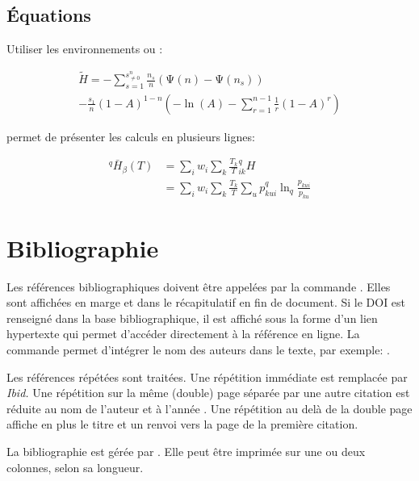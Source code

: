 \documentclass[
  a4paper, %
  11pt, extrafontsizes, %
  onecolumn, %
  openright, %
]{memoir}
\begin{document}
\subsection{\'Equations}

Utiliser les environnements  ou :

\begin{multline}
  \tilde{H}
  = -\sum_{s=1}^{s^{n}_{\ne 0}}
    {\frac{n_s}{n}\left(\mathrm{\Psi}\left(n\right) - \mathrm{\Psi}\left(n_s\right)\right)} \\
    -\frac{s_{1}}{n} {\left(1-A\right)}^{1-n} \left(-{\ln\left(A\right)}-\sum^{n-1}_{r=1}{\frac{1}{r}{\left(1-A\right)}^r}\right)
\label{eq:Chao2013}
\end{multline}

  permet de présenter les calculs en plusieurs lignes:

\begin{align}
  ^{q}\bar{H}_{\beta}\left(T\right)
    &= \sum_i{w_i}\sum_k{\frac{T_k}{T}{^{q}_{ik}H}}\\
    &= \sum_i{w_i}\sum_k{\frac{T_k}{T}\sum_u{p^{q}_{kui}\ln_q\frac{p_{kui}}{p_{ku}}}}
\end{align}



\section{Bibliographie}

Les références bibliographiques doivent être appelées par la commande . 
Elles sont affichées en marge \autocite{Rao1985} et dans le récapitulatif en fin de document.
Si le DOI est renseigné dans la base bibliographique, il est affiché sous la forme d'un lien hypertexte qui permet d'accéder directement à la référence en ligne.
La commande  permet d'intégrer le nom des auteurs dans le texte, par exemple: \textcite{Rao1985}.

Les références répétées \autocite{Pelissier2001} sont traitées.
Une répétition immédiate est remplacée par \emph{Ibid.} \autocite{Pelissier2001}
Une répétition sur la même (double) page séparée par une autre citation \autocite{Rao1985} est réduite au nom de l'auteur et à l'année \autocite{Pelissier2001}.
Une répétition au delà de la double page affiche en plus le titre et un renvoi vers la page de la première citation.

La bibliographie est gérée par .
Elle peut être imprimée sur une ou deux colonnes, selon sa longueur.
\end{document}

